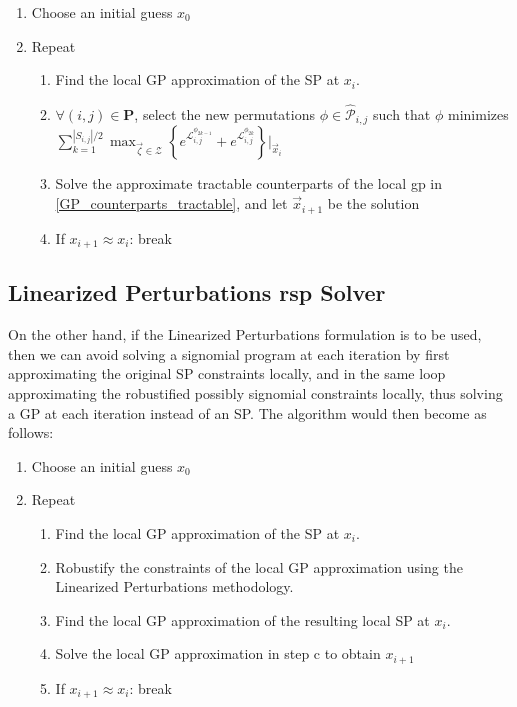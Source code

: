\begin{enumerate}
    \item Choose an initial guess $x_0$
    \item Repeat
    \begin{enumerate}
        \item Find the local GP approximation of the SP at $x_i$.
        \item $\forall (i,j) \in \mathbf{P}$, select the new permutations $\phi \in \hat{\mathcal{P}}_{i,j}$
                such that $\phi$ minimizes $\textstyle{\sum}_{k=1}^{|S_{i,j}|/2}
        {\displaystyle \max_{\vec{\zeta} \in \mathcal{Z}}} \left\{e^{\mathcal{L}^{\phi_{2k-1}}_{i,j}} +
        e^{\mathcal{L}^{\phi_{2k}}_{i,j}}\right\}\bigg\rvert_{\vec{x}_i}$
        \item Solve the approximate tractable counterparts of the local \gls{gp} in
                \eqref{GP_counterparts_tractable}, and let $\vec{x}_{i+1}$ be the solution
        \item If $x_{i+1} \approx x_{i}$: break
    \end{enumerate}
\end{enumerate}

\subsection{Linearized Perturbations \gls{rsp} Solver}

On the other hand, if the Linearized Perturbations formulation is to be used,
then we can avoid solving a signomial program at each iteration by first
approximating the original SP constraints locally, and in the same loop approximating
the robustified possibly signomial constraints locally, thus solving a
GP at each iteration instead of an SP. The algorithm would then become as follows:

\begin{enumerate}
    \item Choose an initial guess $x_0$
    \item Repeat
    \begin{enumerate}
        \item Find the local GP approximation of the SP at $x_i$.
        \item Robustify the constraints of the local GP approximation using the Linearized Perturbations methodology.
        \item Find the local GP approximation of the resulting local SP at $x_i$.
        \item Solve the local GP approximation in step c to obtain $x_{i+1}$
        \item If $x_{i+1} \approx x_{i}$: break
    \end{enumerate}
\end{enumerate}
